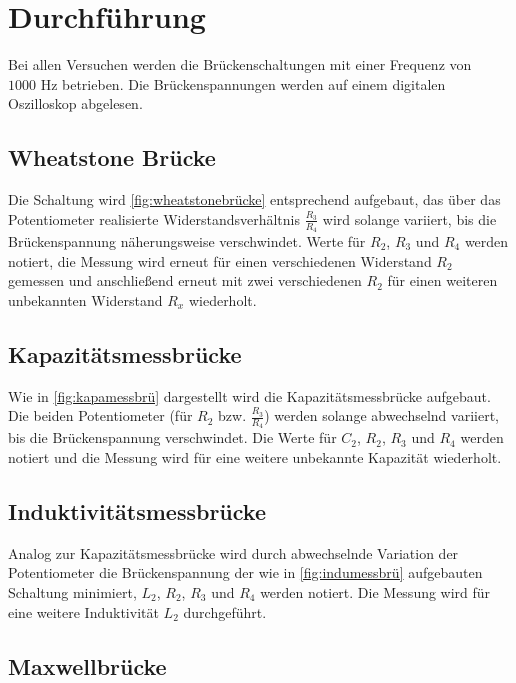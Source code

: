 \section{Durchführung}
\label{sec:Durchführung}

Bei allen Versuchen werden die Brückenschaltungen mit einer Frequenz von $1000 \, \, \unit{\hertz}$ betrieben.
Die Brückenspannungen werden auf einem digitalen Oszilloskop abgelesen.

\subsection{Wheatstone Brücke}

Die Schaltung wird \autoref{fig:wheatstonebrücke} entsprechend aufgebaut, das über das Potentiometer
realisierte Widerstandsverhältnis $\frac{R_3}{R_4}$ wird solange variiert, bis die Brückenspannung 
näherungsweise verschwindet.
Werte für $R_2$, $R_3$ und $R_4$ werden notiert, die Messung wird erneut für einen verschiedenen 
Widerstand $R_2$ gemessen und anschließend erneut mit zwei verschiedenen $R_2$ für einen weiteren 
unbekannten Widerstand $R_x$ wiederholt.


\subsection{Kapazitätsmessbrücke}

Wie in \autoref{fig:kapamessbrü} dargestellt wird die Kapazitätsmessbrücke aufgebaut.
Die beiden Potentiometer (für $R_2$ bzw. $\frac{R_3}{R_4}$) werden solange abwechselnd variiert, 
bis die Brückenspannung verschwindet. Die Werte für $C_2$, $R_2$, $R_3$ und $R_4$ werden notiert und die Messung
wird für eine weitere unbekannte Kapazität wiederholt.


\subsection{Induktivitätsmessbrücke}
\label{subsec:indumessdurch}

Analog zur Kapazitätsmessbrücke wird durch abwechselnde Variation der Potentiometer die Brückenspannung
der wie in \autoref{fig:indumessbrü} aufgebauten Schaltung minimiert, $L_2$, $R_2$, $R_3$ und $R_4$ 
werden notiert.
Die Messung wird für eine weitere Induktivität $L_2$ durchgeführt.


\subsection{Maxwellbrücke}

